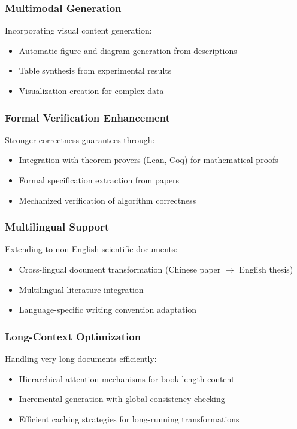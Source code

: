 \documentclass{ieeeaccess}
\begin{document}
\subsubsection{Multimodal Generation}

Incorporating visual content generation:
\begin{itemize}
\item Automatic figure and diagram generation from descriptions
\item Table synthesis from experimental results
\item Visualization creation for complex data
\end{itemize}

\subsubsection{Formal Verification Enhancement}

Stronger correctness guarantees through:
\begin{itemize}
\item Integration with theorem provers (Lean, Coq) for mathematical proofs
\item Formal specification extraction from papers
\item Mechanized verification of algorithm correctness
\end{itemize}

\subsubsection{Multilingual Support}

Extending to non-English scientific documents:
\begin{itemize}
\item Cross-lingual document transformation (Chinese paper $\rightarrow$ English thesis)
\item Multilingual literature integration
\item Language-specific writing convention adaptation
\end{itemize}

\subsubsection{Long-Context Optimization}

Handling very long documents efficiently:
\begin{itemize}
\item Hierarchical attention mechanisms for book-length content
\item Incremental generation with global consistency checking
\item Efficient caching strategies for long-running transformations
\end{itemize}
\end{document}
